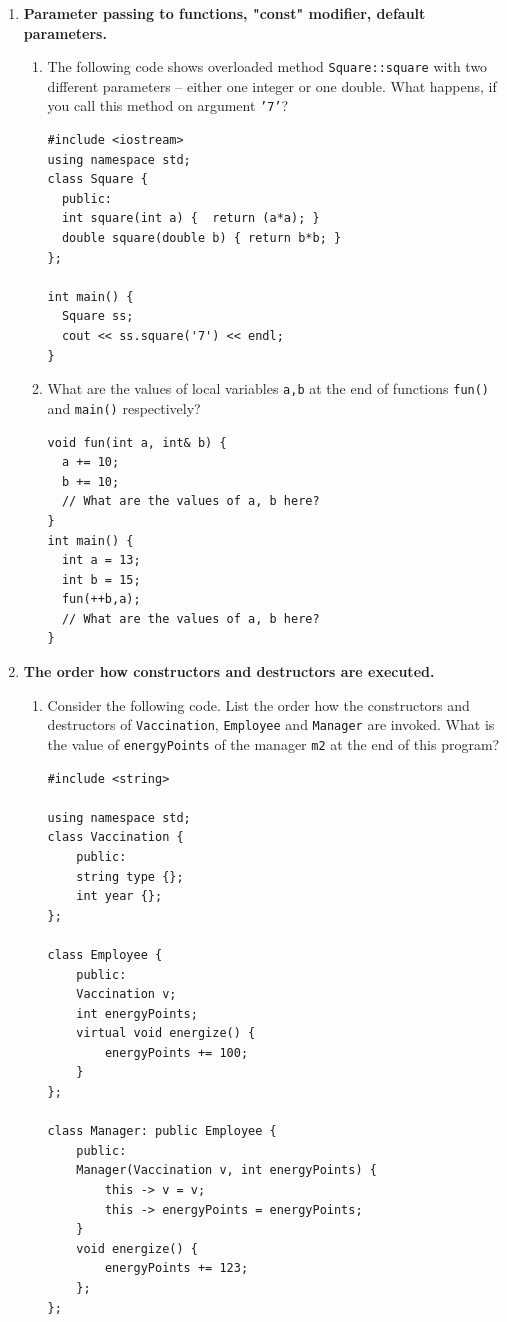 \documentclass[a4paper,12pt]{article}
\begin{document}
\begin{enumerate}[label=2.\Alph*.]
\item {\bf Parameter passing to functions, "const" modifier, default parameters.} 
\begin{enumerate} 
\item
The following code shows overloaded method {\tt Square::square} 
with two different parameters -- either one integer or one double. 
What happens, if you call this method on argument {\tt '7'}? 
\begin{verbatim}
#include <iostream> 
using namespace std;
class Square {
  public:
  int square(int a) {  return (a*a); }
  double square(double b) { return b*b; }
};

int main() {
  Square ss;
  cout << ss.square('7') << endl;
}
\end{verbatim}
\item 
What are the values of local variables {\tt a,b} at the 
end of functions {\tt fun()} and {\tt main()} respectively?
\begin{verbatim}
void fun(int a, int& b) {
  a += 10; 
  b += 10;
  // What are the values of a, b here?
}
int main() {
  int a = 13;
  int b = 15; 
  fun(++b,a);
  // What are the values of a, b here?
}
\end{verbatim}
\end{enumerate}

\item {\bf The order how constructors and destructors are executed.}
\begin{enumerate}
\item Consider the following code. 
List the order how the constructors and destructors of 
{\tt Vaccination}, {\tt Employee} and {\tt Manager} 
are invoked. What is the value of {\tt energyPoints} 
of the manager {\tt m2} at the end of this program?

\begin{verbatim}
#include <string>

using namespace std;
class Vaccination {
    public:
    string type {}; 
    int year {}; 
};

class Employee {
    public:
    Vaccination v; 
    int energyPoints; 
    virtual void energize() {
        energyPoints += 100;
    }
};

class Manager: public Employee {
    public:
    Manager(Vaccination v, int energyPoints) {
        this -> v = v;
        this -> energyPoints = energyPoints;
    }
    void energize() {
        energyPoints += 123;
    };
};


\end{verbatim}
\end{enumerate}
\end{enumerate}
\end{document}
